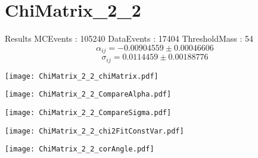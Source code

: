 \documentclass[a4paper,12pt]{article}
\begin{document}
\section{ChiMatrix\_2\_2}
\begin{minipage}{0.49\linewidth} Results \newline
MCEvents : 105240\newline
DataEvents : 17404 \newline
ThresholdMass : 54\\
$$\alpha_{ij} = -0.00904559\pm 0.00046606$$
$$\sigma_{ij} = 0.0114459\pm 0.00188776$$
\end{minipage}\hfill
\begin{minipage}{0.49\linewidth} 
\texttt{[image: ChiMatrix\_2\_2\_chiMatrix.pdf]}\\
\end{minipage}
\hfill
\begin{minipage}{0.49\linewidth} 
\texttt{[image: ChiMatrix\_2\_2\_CompareAlpha.pdf]}\\
\end{minipage}
\hfill
\begin{minipage}{0.49\linewidth} 
\texttt{[image: ChiMatrix\_2\_2\_CompareSigma.pdf]}\\
\end{minipage}
\begin{minipage}{0.49\linewidth} 
\texttt{[image: ChiMatrix\_2\_2\_chi2FitConstVar.pdf]}\\
\end{minipage}
\hfill
\begin{minipage}{0.49\linewidth} 
\texttt{[image: ChiMatrix\_2\_2\_corAngle.pdf]}\\
\end{minipage}
\end{document}
